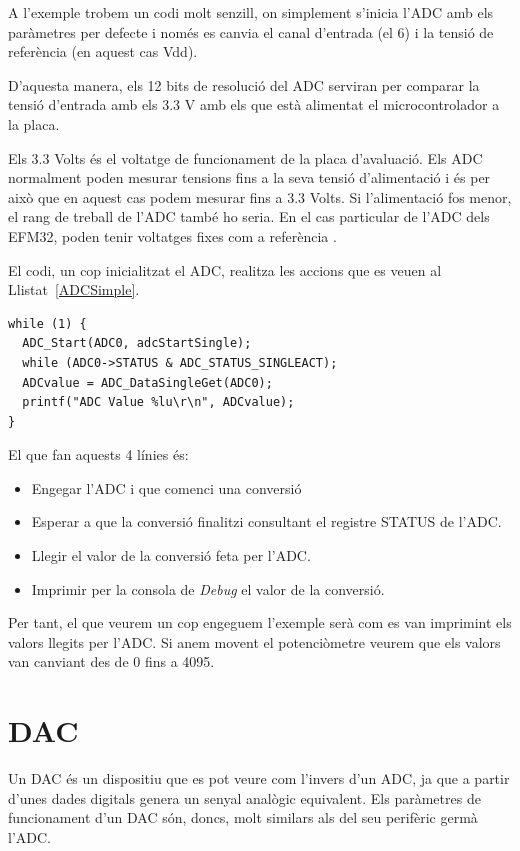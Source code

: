 A l'exemple trobem un codi molt senzill, on simplement s'inicia l'\gls{ADC} amb els paràmetres per defecte i només es canvia el canal d'entrada (el 6) i la tensió de referència (en aquest cas Vdd).

D'aquesta manera, els 12 bits de resolució del ADC serviran per comparar la tensió d'entrada amb els 3.3 V amb els que està alimentat el microcontrolador a la placa.

\begin{remark}
 Els 3.3 Volts és el voltatge de funcionament de la placa d'avaluació. Els ADC normalment poden mesurar tensions fins a la seva tensió d'alimentació i és per això que en aquest cas podem mesurar fins a 3.3 Volts. Si l'alimentació fos menor, el rang de treball de l'ADC també ho seria. En el cas particular de l'ADC dels EFM32, poden tenir voltatges fixes com a referència \cite[378]{EFM32GRM}.
\end{remark}

El codi, un cop inicialitzat el ADC, realitza les accions que es veuen al Llistat~\ref{ADCSimple}.
\begin{lstlisting}[frame=single,caption={Codi de lectura de l'ADC},style=customc, label=ADCSimple]
while (1) {
  ADC_Start(ADC0, adcStartSingle);
  while (ADC0->STATUS & ADC_STATUS_SINGLEACT);
  ADCvalue = ADC_DataSingleGet(ADC0);
  printf("ADC Value %lu\r\n", ADCvalue);
}
\end{lstlisting}

El que fan aquests 4 línies és:
\begin{itemize}
 \item Engegar l'ADC i que comenci una conversió
 \item Esperar a que la conversió finalitzi consultant el registre STATUS de l'ADC.
 \item Llegir el valor de la conversió feta per l'ADC.
 \item Imprimir per la consola de {\em Debug} el valor de la conversió.
\end{itemize}

Per tant, el que veurem un cop engeguem l'exemple serà com es van imprimint els valors llegits per l'\gls{ADC}. Si anem movent el potenciòmetre veurem que els valors van canviant des de 0 fins a 4095.

\chapter{DAC}
\label{sub:DAC}
Un \gls{DAC} és un dispositiu que es pot veure com l'invers d'un ADC, ja que a partir d'unes dades digitals genera un senyal analògic equivalent. Els paràmetres de funcionament d'un DAC són, doncs, molt similars als del seu perifèric germà l'\gls{ADC}.

